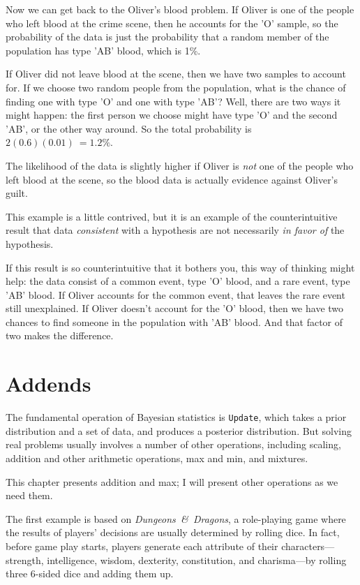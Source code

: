\documentclass[12pt]{book}
\begin{document}
Now we can get back to the Oliver's blood problem.  If Oliver is
one of the people who left blood at the crime scene, then he
accounts for the 'O' sample, so the probability of the data
is just the probability that a random member of the population
has type 'AB' blood, which is 1\%.

If Oliver did not leave blood at the scene, then we have two
samples to account for.  If we choose two random people from
the population, what is the chance of finding one with type 'O'
and one with type 'AB'?  Well, there are two ways it might happen:
the first person we choose might have type 'O' and the second
'AB', or the other way around.  So the total probability is
$2 (0.6) (0.01)\ = 1.2\%$.

The likelihood of the data is slightly higher if Oliver is
{\it not} one of the people who left blood at the scene, so
the blood data is actually evidence against Oliver's guilt.

This example is a little contrived, but it is an example of
the counterintuitive result that data {\it consistent} with
a hypothesis are not necessarily {\it in favor of}
the hypothesis.

If this result is so counterintuitive that it bothers you,
this way of thinking might help: the data consist of a common
event, type 'O' blood, and a rare event, type 'AB' blood.
If Oliver accounts for the common event, that leaves the rare
event still unexplained.  If Oliver doesn't account for the
'O' blood, then we have two chances to find someone in the
population with 'AB' blood.  And that factor of two makes
the difference.


\section{Addends}
\label{addends}

The fundamental operation of Bayesian statistics is
{\tt Update}, which takes a prior distribution and a set
of data, and produces a posterior distribution.  But solving
real problems usually involves a number of other operations,
including scaling, addition and other arithmetic operations,
max and min, and mixtures.

This chapter presents addition and max; I will present
other operations as we need them.

The first example is based on
{\it Dungeons~\&~Dragons}, a role-playing game where the results
of players' decisions are usually determined by rolling dice.
In fact, before game play starts, players generate each
attribute of their characters---strength, intelligence, wisdom,
dexterity, constitution, and charisma---by rolling three
6-sided dice and adding them up.
\end{document}
